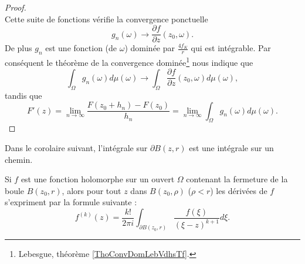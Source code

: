 \begin{proof}
\begin{equation}
	\end{equation}
	Cette suite de fonctions vérifie la convergence ponctuelle
	\begin{equation}
		g_n(\omega)\to\frac{ \partial f }{ \partial z }(z_0,\omega).
	\end{equation}
	De plus \( g_n\) est une fonction (de \( \omega\)) dominée par \( \frac{ 4f_K }{ r }\) qui est intégrable. Par conséquent le théorème de la convergence dominée\footnote{Lebesgue, théorème \ref{ThoConvDomLebVdhsTf}.} nous indique que
	\begin{equation}
		\int_{\Omega}g_n(\omega)d\mu(\omega)\to \int_{\Omega}\frac{ \partial f }{ \partial z }(z_0,\omega)d\mu(\omega),
	\end{equation}
	tandis que
	\begin{equation}
		F'(z)=\lim_{n\to \infty} \frac{ F(z_0+h_n)-F(z_0) }{ h_n }=\lim_{n\to \infty} \int_{\Omega}g_n(\omega)d\mu(\omega).
	\end{equation}
\end{proof}

\begin{normaltext}
	Dans le corolaire suivant, l'intégrale sur \( \partial B(z,r)\) est une intégrale sur un chemin.
\end{normaltext}

\begin{corollary}       \label{CorNxTjEj}
	Si \( f\) est une fonction holomorphe sur un ouvert \( \Omega\) contenant la fermeture de la boule \( B(z_0,r)\), alors pour tout \( z\) dans \( B(z_0,\rho)\) (\( \rho<r\)) les dérivées de \( f\) s'expriment par la formule suivante :
	\begin{equation}        \label{EQooBPIQooNhOTtB}
		f^{(k)}(z)=\frac{k!}{ 2\pi i }\int_{\partial B(z_0,r)}\frac{ f(\xi) }{ (\xi-z)^{k+1} }d\xi.
	\end{equation}
\end{corollary}

